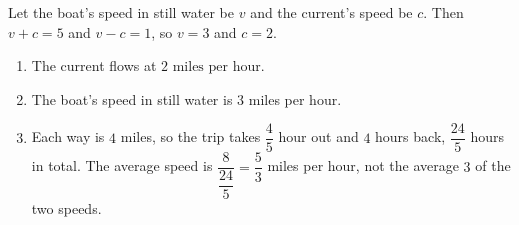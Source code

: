 Let the boat's speed in still water be $v$ and the current's speed be $c$. Then $v+c=5$ and $v-c=1$, so $v=3$ and $c=2$.
\begin{enumerate}
\item[(a)] The current flows at $\boxed{2\text{ miles per hour}}$.
\item[(b)] The boat's speed in still water is $3$ miles per hour.
\item[(c)] Each way is $4$ miles, so the trip takes $\dfrac45$ hour out and $4$ hours back, $\dfrac{24}{5}$ hours in total. The average speed is $\dfrac{8}{\dfrac{24}{5}}=\dfrac53$ miles per hour, not the average $3$ of the two speeds.
\end{enumerate}
